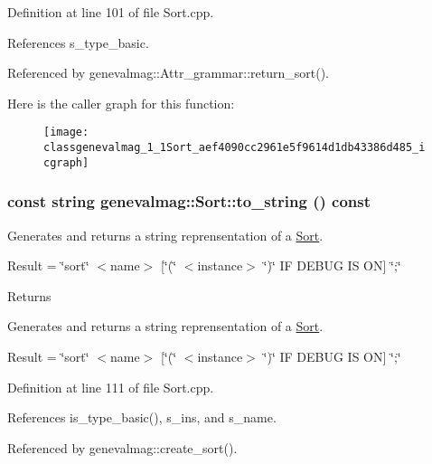 Definition at line 101 of file Sort.cpp.



References s\_\-type\_\-basic.



Referenced by genevalmag::Attr\_\-grammar::return\_\-sort().



Here is the caller graph for this function:\nopagebreak
\begin{figure}[H]
\begin{center}
\leavevmode
\texttt{[image: classgenevalmag\_1\_1Sort\_aef4090cc2961e5f9614d1db43386d485\_icgraph]}
\end{center}
\end{figure}


\hypertarget{classgenevalmag_1_1Sort_a669e4c331b862e2970738c3e9ad88749}{
\subsubsection[{to\_\-string}]{\setlength{\rightskip}{0pt plus 5cm}const string genevalmag::Sort::to\_\-string () const}}
\label{classgenevalmag_1_1Sort_a669e4c331b862e2970738c3e9ad88749}
Generates and returns a string reprensentation of a \hyperlink{classgenevalmag_1_1Sort}{Sort}.\par
 \par
 Result = \char`\"{}sort\char`\"{} $<$name$>$ \mbox{[}\char`\"{}(\char`\"{} $<$instance$>$ \char`\"{})\char`\"{} IF DEBUG IS ON\mbox{]} \char`\"{};\char`\"{}\par
 \begin{DoxyReturn}{Returns}

\end{DoxyReturn}
Generates and returns a string reprensentation of a \hyperlink{classgenevalmag_1_1Sort}{Sort}.

Result = \char`\"{}sort\char`\"{} $<$name$>$ \mbox{[}\char`\"{}(\char`\"{} $<$instance$>$ \char`\"{})\char`\"{} IF DEBUG IS ON\mbox{]} \char`\"{};\char`\"{} 

Definition at line 111 of file Sort.cpp.



References is\_\-type\_\-basic(), s\_\-ins, and s\_\-name.



Referenced by genevalmag::create\_\-sort().



